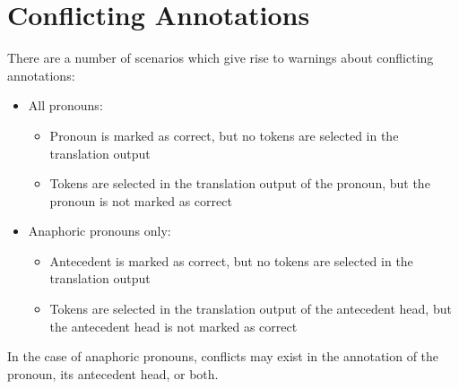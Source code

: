 \documentclass[11pt]{article} %
\begin{document}
\section{Conflicting Annotations}
\label{ConflictingAnnotations}
There are a number of scenarios which give rise to warnings about conflicting annotations:
\begin{itemize}
  \item All pronouns:
  \begin{itemize}
    \item Pronoun is marked as correct, but no tokens are selected in the translation output
    \item Tokens are selected in the translation output of the pronoun, but the pronoun is not marked as correct
  \end{itemize}
  \item Anaphoric pronouns only:
  \begin{itemize}
    \item Antecedent is marked as correct, but no tokens are selected in the translation output
    \item Tokens are selected in the translation output of the antecedent head, but the antecedent head is not marked as correct 
  \end{itemize}
\end{itemize}

In the case of anaphoric pronouns, conflicts may exist in the annotation of the pronoun, its antecedent head, or both.
\end{document}
